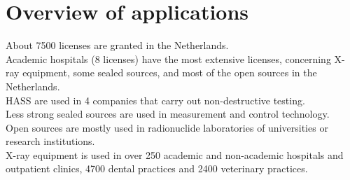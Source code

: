 \section{Overview of applications}
About 7500 licenses are granted in the Netherlands.\\ 
Academic hospitals (8 licenses) have the most extensive licenses, concerning X-ray equipment, some sealed sources, and most of the open sources in the Netherlands. \\
HASS are used in 4 companies that carry out non-destructive testing. \\
Less strong sealed sources are used in measurement and control technology. \\
Open sources are mostly used in radionuclide laboratories of universities or research institutions. \\
X-ray equipment is used in over 250 academic and non-academic hospitals and outpatient clinics, 4700 dental practices and 2400 veterinary practices. 
